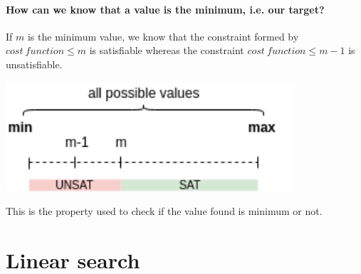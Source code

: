 \paragraph{How can we know that a value is the minimum, i.e. our target?\\}
If $m$ is the minimum value, we know that the constraint formed by $cost \ function \leq m$ is satisfiable whereas the constraint $cost \ function \leq m-1$ is unsatisfiable.\\
\begin{center}
	\includegraphics[width=0.8\textwidth]{Figures/SearchSpace2.png}
	\label{search_space_2}
\end{center}
This is the property used to check if the value found is minimum or not.

\section{Linear search}

